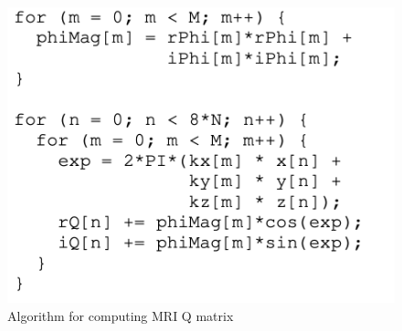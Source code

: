 \documentclass{sig-alternate}
\begin{document}
\begin{figure}[t]
\centering
\captionsetup{justification=centering, format=hang}
\includegraphics[width=0.85\columnwidth]{figure/algorithm-proposal.png}
\caption{Algorithm for computing MRI Q matrix~\cite{stone2008accelerating}}
\label{fig:esp}
\end{figure}


{\small
\balance
%


}






\end{document}
